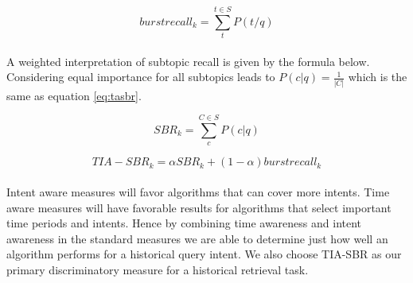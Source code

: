 \begin{equation}
burstrecall_k = \sum_t^{t \in S} P(t/q)
\end{equation}

\paragraph{}
A weighted interpretation of subtopic recall is given by the formula below. Considering equal importance for all subtopics leads to $P(c|q) = \frac{1}{|C|}$ which is the same as equation \ref{eq:tasbr}. 

\begin{equation}
SBR_k = \sum_c^{C \in S} P(c|q)
\end{equation}

\begin{equation}
\label{eq:tasbr}
TIA-SBR_k =  \alpha  SBR_k +  (1-\alpha) burstrecall_k
\end{equation}

\paragraph{}
Intent aware measures will favor algorithms that can cover more intents. Time aware measures will have favorable results for algorithms that select important time periods and intents. Hence by combining time awareness and intent awareness in the standard measures we are able to determine just how well an algorithm performs for a historical query intent. We also choose TIA-SBR as our primary discriminatory measure for a historical retrieval task. 
